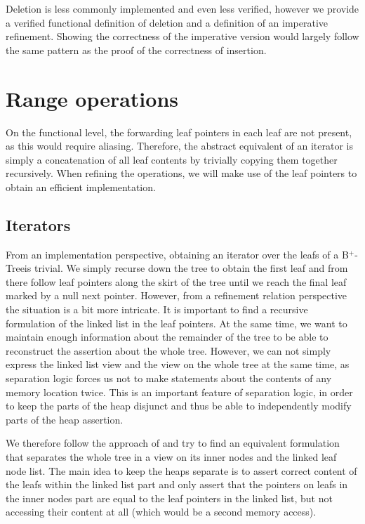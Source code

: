 \documentclass[a4paper,UKenglish,cleveref, autoref, thm-restate]{lipics-v2021}
\newcommand{\btree}{B$^+$-Tree}
\begin{document}
Deletion is less commonly implemented and even less verified,
however we provide a verified functional definition of deletion and a definition of an imperative refinement.
Showing the correctness of the imperative version would largely follow
the same pattern as the proof of the correctness of insertion.



\section{Range operations}
\label{sec:range}

On the functional level, the forwarding leaf pointers in each leaf
are not present, as this would require aliasing.
Therefore, the abstract equivalent of an iterator
is simply a concatenation of all leaf contents by
trivially copying them together recursively.
When refining the operations, we will make use of the leaf pointers
to obtain an efficient implementation.

\subsection{Iterators}
\label{sec:imperative_iter}

From an implementation perspective, obtaining an iterator over the leafs
of a \btree is trivial.
We simply recurse down the tree to obtain the first leaf and from there follow leaf
pointers along the skirt of the tree until we reach the final leaf marked by a null next pointer.
However, from a refinement relation perspective the situation is a bit more intricate.
It is important to find a recursive formulation of the linked list in the leaf pointers.
At the same time, we want to maintain enough information about the remainder of the tree
to be able to reconstruct the assertion about the whole tree.
However, we can not simply express the linked list view and the view on the
whole tree at the same time,
as separation logic forces us not to make statements about the contents of
any memory location twice.
This is an important feature of separation logic,
in order to keep the parts of the heap disjunct and
thus be able to independently modify parts of the heap assertion.

We therefore follow the approach of \cite{DBLP:conf/popl/MalechaMSW10} and
try to find an equivalent formulation that separates the whole tree in a
view on its inner nodes and the linked leaf node list.
The main idea to keep the heaps separate is to
assert correct content of the leafs within the linked list part
and only assert that the pointers on leafs in the inner nodes part
are equal to the leaf pointers in the linked list, but not accessing
their content at all (which would be a second memory access).
\end{document}
